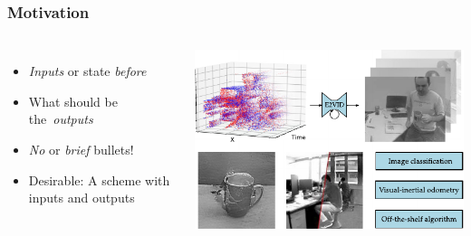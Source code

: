\begin{frame}
  \frametitle{Motivation}
  \begin{columns}
    \begin{itemize}
        \item \emph{Inputs} or state \emph{before}
        \item What should be the~\emph{outputs}
        \item \emph{No} or \emph{brief} bullets!
        \item Desirable: A scheme with inputs and outputs
    \end{itemize}

    \includegraphics[width=\textwidth]{img/template-Teaser.pdf}
  \end{columns}
\end{frame}






